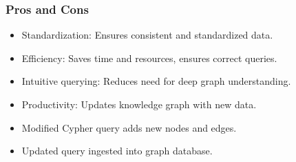 










\begin{frame}[fragile]\frametitle{Pros and Cons}

\begin{itemize}
\item Standardization: Ensures consistent and standardized data.
\item Efficiency: Saves time and resources, ensures correct queries.
\item Intuitive querying: Reduces need for deep graph understanding.
\item Productivity: Updates knowledge graph with new data.
\item Modified Cypher query adds new nodes and edges.
\item Updated query ingested into graph database.
\end{itemize}
\end{frame}


